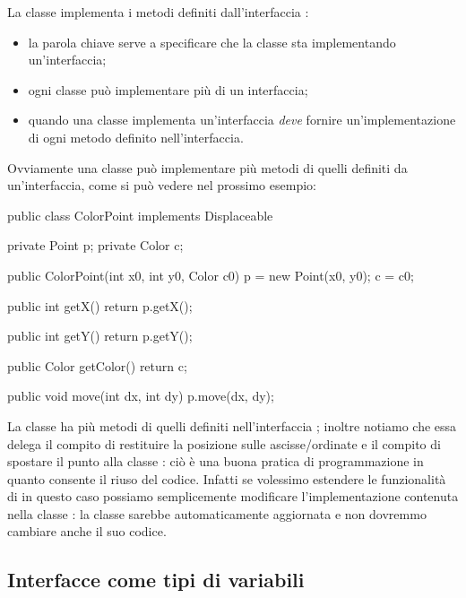 La classe  implementa i metodi definiti dall'interfaccia :
\begin{itemize}
    \item la parola chiave  serve a specificare che la classe sta implementando un'interfaccia;
    \item ogni classe può implementare più di un interfaccia;
    \item quando una classe implementa un'interfaccia \emph{deve} fornire un'implementazione di ogni metodo definito nell'interfaccia.
\end{itemize}

Ovviamente una classe può implementare più metodi di quelli definiti da un'interfaccia, come si può vedere nel prossimo esempio:
\begin{Java}
    public class ColorPoint implements Displaceable {
        private Point p;
        private Color c;

        public ColorPoint(int x0, int y0, Color c0){
            p = new Point(x0, y0);
            c = c0;
        }

        public int getX(){
            return p.getX();
        }

        public int getY(){
            return p.getY();
        }

        public Color getColor(){
            return c;
        }

        public void move(int dx, int dy){
            p.move(dx, dy);
        }
    }
\end{Java}

La classe  ha più metodi di quelli definiti nell'interfaccia ; 
inoltre notiamo che essa delega il compito di restituire la posizione sulle ascisse/ordinate e il compito di spostare il punto alla classe : ciò è una buona pratica di programmazione in quanto consente il riuso del codice. 
Infatti se volessimo estendere le funzionalità di  in questo caso possiamo semplicemente modificare l'implementazione contenuta nella classe : la classe  sarebbe automaticamente aggiornata e non dovremmo cambiare anche il suo codice.

\subsection{Interfacce come tipi di variabili}

